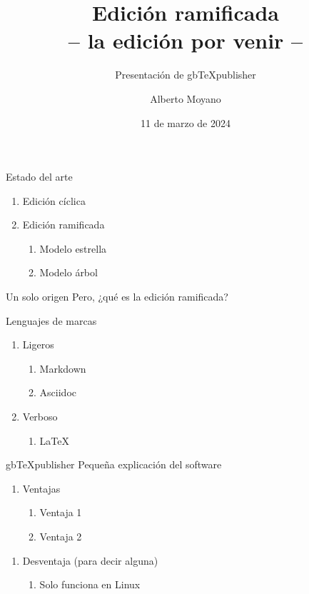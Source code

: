 \documentclass[14pt,aspectratio=169]{beamer}
\title{Edición ramificada\\ -- la edición por venir --}
\subtitle{Presentación de gbTeXpublisher}
\author{Alberto Moyano}
\date{11 de marzo de 2024}
\begin{document}
\begin{frame}
\titlepage
\end{frame}




\begin{frame}{Estado del arte}
	\begin{enumerate}
		\item Edición cíclica
		\item Edición ramificada
			\begin{enumerate}
				\item Modelo estrella
				\item Modelo árbol
			\end{enumerate}
	\end{enumerate}
\end{frame}


\begin{frame}{Un solo origen}
	Pero, ¿qué es la edición ramificada?

\end{frame}

\begin{frame}{Lenguajes de marcas}
	\begin{enumerate}
		\item Ligeros
			\begin{enumerate}
			\item Markdown
			\item Asciidoc
		\end{enumerate}
		\item Verboso
		\begin{enumerate}
			\item LaTeX
		\end{enumerate}
	\end{enumerate}
\end{frame}

\begin{frame}{gbTeXpublisher}
	Pequeña explicación del software
	\begin{enumerate}
	\item Ventajas
		\begin{enumerate}
		\item Ventaja 1
		\item Ventaja 2
		\end{enumerate}
	\end{enumerate}
	\begin{enumerate}
	\item Desventaja (para decir alguna)
		\begin{enumerate}
		\item Solo funciona en Linux
		\end{enumerate}
	\end{enumerate}
\end{frame}
\end{document}
